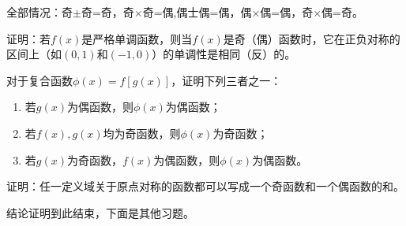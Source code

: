 \documentclass[lang=cn,math=cm,chinesefont=nofont,11pt,scheme=chinese,twocol]{elegantbook}
\begin{document}
\begin{remark}
  全部情况：奇$\pm$奇=奇，奇$\times$奇=偶,偶士偶=偶，偶×偶=偶，奇×偶=奇。
\end{remark}

\begin{exercise}
  证明：若$f(x)$是严格单调函数，则当$f(x)$是奇（偶）函数时，它在正负对称的区间上（如$(0,1)$和$(-1,0)$）的单调性是相同（反）的。
\end{exercise}

\begin{exercise}
  对于复合函数$\phi(x)=f[g(x)]$，证明下列三者之一：
\end{exercise}

\begin{enumerate}
  \item 若$g(x)$为偶函数，则$\phi(x)$为偶函数；
  \item 若$f(x),g(x)$均为奇函数，则$\phi(x)$为奇函数；
  \item 若$g(x)$为奇函数，$f(x)$为偶函数，则$\phi(x)$为偶函数。
\end{enumerate}

\begin{exercise}
  证明：任一定义域关于原点对称的函数都可以写成一个奇函数和一个偶函数的和。
\end{exercise}

\hspace*{\fill}

结论证明到此结束，下面是其他习题。
\end{document}
